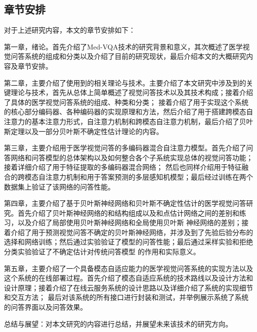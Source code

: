 \subsection{章节安排}
对于上述研究内容，本文的章节安排如下：

第一章，绪论。首先介绍了Med-VQA技术的研究背景和意义，其次概述了医学视觉问答系统的组成和分类以及介绍了目前的研究现状，最后介绍本文的大概研究内容及章节安排。

第二章，主要介绍了使用到的相关理论与技术。主要介绍了本文研究中涉及到的关键理论与技术，首先从总体上简单概述了视觉问答技术以及其技术构成；接着介绍了具体的医学视觉问答系统的组成、种类和分类；
接着介绍了用于实现这个系统的核心部分编码器、各种编码器的实现原理和方法，然后介绍了用于搭建跨模态自注意力的基本注意力形式，自注意力机制和跨模态自注意力机制，最后介绍了贝叶斯定理以及一部分贝叶斯不确定性估计理论的内容。

第三章，主要介绍用于医学视觉问答的多编码器混合自注意力模型。首先介绍了问答网络和问答模型的总体架构以及如何整合各个子系统实现总体的视觉问答功能；接着详细介绍了用于特征提取的多编码器混合网络；
然后也同样介绍用于特征融合的跨模态自注意力机制和用于答案预测的多层感知机模型；最后经过训练在两个数据集上验证了该网络的问答性能。

第四章，主要介绍了基于贝叶斯神经网络和贝叶斯不确定性估计的医学视觉问答研究。首先介绍了贝叶斯神经网络的和结构组成以及和点估计网络之间的差别和练习，以及介绍了局部使用贝叶斯神经网络和全局使用贝叶斯
神经网络的差别；接着介绍了用于预测视觉问答不确定的贝叶斯神经网络，并涉及到了先验后验分布的选择和网络训练；然后通过实验验证了模型的问答性能；最后通过采样实验和拒绝分类实验验证了不确定估计对传统问答模型
的作用和实际意义。

第五章，主要介绍了一个具备模态自适应能力的医学视觉问答系统的实现方法以及这个系统的在线部署过程。首先介绍了模态自适应系统的技术路线以及设计方法和设计原理；接着介绍了在线云服务系统的设计思路以及详细介绍了系统的实现细节和交互方法；
最后对该系统的所有接口进行封装和测试，并举例展示系统了系统的问答界面以及问答效果。

总结与展望：对本文研究的内容进行总结，并展望未来该技术的研究方向。


